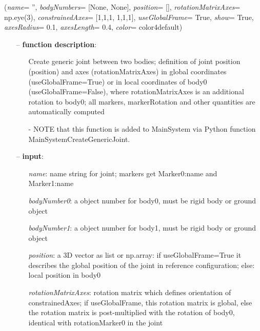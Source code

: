 \begin{flushleft}
\label{sec:mainsystemextensions:CreateGenericJoint}
({\it name}= '', {\it bodyNumbers}= [None, None], {\it position}= [], {\it rotationMatrixAxes}= np.eye(3), {\it constrainedAxes}= [1,1,1, 1,1,1], {\it useGlobalFrame}= True, {\it show}= True, {\it axesRadius}= 0.1, {\it axesLength}= 0.4, {\it color}= color4default)
\end{flushleft}
\setlength{\itemindent}{0.7cm}
\begin{itemize}[leftmargin=0.7cm]
\item[--]
{\bf function description}: \vspace{-6pt}
\begin{itemize}[leftmargin=1.2cm]
\setlength{\itemindent}{-0.7cm}
\item[]Create generic joint between two bodies; definition of joint position (position) and axes (rotationMatrixAxes) in global coordinates (useGlobalFrame=True) or in local coordinates of body0 (useGlobalFrame=False), where rotationMatrixAxes is an additional rotation to body0; all markers, markerRotation and other quantities are automatically computed
\item[]- NOTE that this function is added to MainSystem via Python function MainSystemCreateGenericJoint.
\end{itemize}
\item[--]
{\bf input}: \vspace{-6pt}
\begin{itemize}[leftmargin=1.2cm]
\setlength{\itemindent}{-0.7cm}
\item[]{\it name}: name string for joint; markers get Marker0:name and Marker1:name
\item[]{\it bodyNumber0}: a object number for body0, must be rigid body or ground object
\item[]{\it bodyNumber1}: a object number for body1, must be rigid body or ground object
\item[]{\it position}: a 3D vector as list or np.array: if useGlobalFrame=True it describes the global position of the joint in reference configuration; else: local position in body0
\item[]{\it rotationMatrixAxes}: rotation matrix which defines orientation of constrainedAxes; if useGlobalFrame, this rotation matrix is global, else the rotation matrix is post-multiplied with the rotation of body0, identical with rotationMarker0 in the joint

\end{itemize}
\end{itemize}
